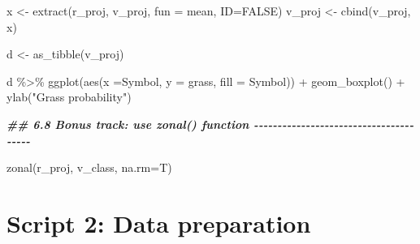 \documentclass[
  10pt,
  b5paper,
  oneside]{book}
\newenvironment{Shaded}{\begin{snugshade}}{\end{snugshade}}
\newcommand{\AttributeTok}[1]{\textcolor[rgb]{0.77,0.63,0.00}{#1}}
\newcommand{\ConstantTok}[1]{\textcolor[rgb]{0.00,0.00,0.00}{#1}}
\newcommand{\DocumentationTok}[1]{\textcolor[rgb]{0.56,0.35,0.01}{\textbf{\textit{#1}}}}
\newcommand{\FunctionTok}[1]{\textcolor[rgb]{0.00,0.00,0.00}{#1}}
\newcommand{\NormalTok}[1]{#1}
\newcommand{\OtherTok}[1]{\textcolor[rgb]{0.56,0.35,0.01}{#1}}
\newcommand{\SpecialCharTok}[1]{\textcolor[rgb]{0.00,0.00,0.00}{#1}}
\newcommand{\StringTok}[1]{\textcolor[rgb]{0.31,0.60,0.02}{#1}}
\begin{document}
\begin{Shaded}
\begin{Highlighting}[]
\NormalTok{x }\OtherTok{\textless{}{-}} \FunctionTok{extract}\NormalTok{(r\_proj, v\_proj, }\AttributeTok{fun =}\NormalTok{ mean, }\AttributeTok{ID=}\ConstantTok{FALSE}\NormalTok{)}
\NormalTok{v\_proj }\OtherTok{\textless{}{-}} \FunctionTok{cbind}\NormalTok{(v\_proj, x)}

\NormalTok{d }\OtherTok{\textless{}{-}} \FunctionTok{as\_tibble}\NormalTok{(v\_proj)}

\NormalTok{d }\SpecialCharTok{\%\textgreater{}\%} 
  \FunctionTok{ggplot}\NormalTok{(}\FunctionTok{aes}\NormalTok{(}\AttributeTok{x =}\NormalTok{Symbol, }\AttributeTok{y =}\NormalTok{ grass, }\AttributeTok{fill =}\NormalTok{ Symbol)) }\SpecialCharTok{+}
  \FunctionTok{geom\_boxplot}\NormalTok{() }\SpecialCharTok{+}
  \FunctionTok{ylab}\NormalTok{(}\StringTok{"Grass probability"}\NormalTok{)}

\DocumentationTok{\#\# 6.8 Bonus track: use zonal() function {-}{-}{-}{-}{-}{-}{-}{-}{-}{-}{-}{-}{-}{-}{-}{-}{-}{-}{-}{-}{-}{-}{-}{-}{-}{-}{-}{-}{-}{-}{-}{-}{-}{-}{-}{-}{-}{-}{-}}

\FunctionTok{zonal}\NormalTok{(r\_proj, v\_class, }\AttributeTok{na.rm=}\NormalTok{T)}
\end{Highlighting}
\end{Shaded}

\hypertarget{script-2-data-preparation}{%
\section*{Script 2: Data preparation}\label{script-2-data-preparation}}
\end{document}
